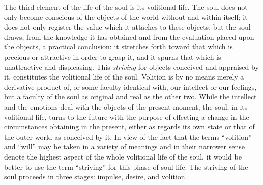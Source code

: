The third element of the life of the soul is its volitional life. The soul does not only become conscious of the objects of the world without and within itself; it does not only register
the value which it attaches to these objects; but the soul draws, from the knowledge it has obtained and from the evaluation placed upon the objects, a practical conclusion: it stretches forth toward that which is precious or attractive in order to grasp it, and it spurns that which is unattractive and displeasing. This \emph{striving} for objects conceived and appraised by it, constitutes the volitional life of the soul. Volition is by no means merely a derivative product of, or some faculty identical with, our intellect or our feelings, but a faculty of the soul as original and real as the other two. While the intellect and the emotions deal with the objects of the present moment, the soul, in its volitional life, turns to the future with the purpose of effecting a change in the circumstances obtaining in the present, either as regards its own state or that of the outer world as conceived by it. In view of the fact that the terms “volition” and “will” may be taken in a variety of meanings and in their narrower sense denote the highest aspect of the whole volitional life of the soul, it would be better to use the term “striving” for this phase of soul life. The striving of the soul proceeds in three stages: impulse, desire, and volition.

